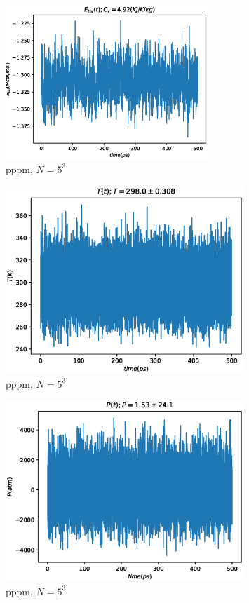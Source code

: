 \documentclass[a4paper,12pt]{article} %
\begin{document}
\begin{figure}[h!]
\begin{center}
\includegraphics[width=0.68\textwidth]{./pics/pppm_N5E}
\end{center}
\caption{pppm, $N = 5^3$} \label{img:pppm_H_N5}
\end{figure}

\newpage

\begin{figure}[h!]
\begin{center}
\includegraphics[width=0.8\textwidth]{./pics/pppm_N5T}
\end{center}
\caption{pppm, $N = 5^3$} \label{img:pppm_H_N5}
\end{figure}

\begin{figure}[h!]
\begin{center}
\includegraphics[width=0.8\textwidth]{./pics/pppm_N5P}
\end{center}
\caption{pppm, $N = 5^3$} \label{img:pppm_H_N5}
\end{figure}
\end{document}
